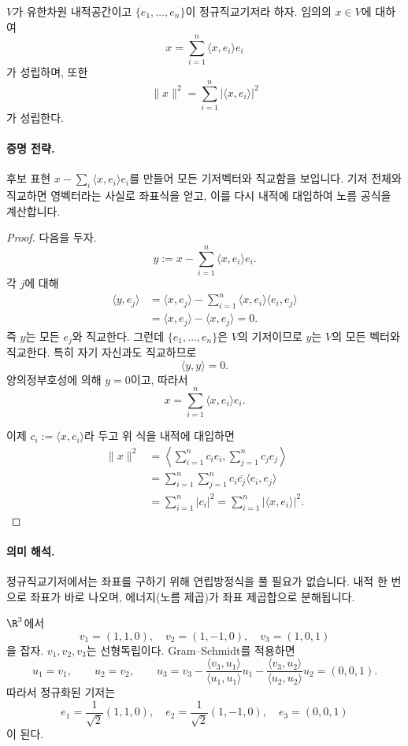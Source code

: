 \begin{theorem}
$V$가 유한차원 내적공간이고 $\{e_1,\dots,e_n\}$이 정규직교기저라 하자. 임의의 $x\in V$에 대하여
$$
x=\sum_{i=1}^n \langle x,e_i\rangle e_i
$$
가 성립하며, 또한
$$
\|x\|^2=\sum_{i=1}^n |\langle x,e_i\rangle|^2
$$
가 성립한다.
\end{theorem}

\paragraph{증명 전략.}
후보 표현 $x-\sum_i\langle x,e_i\rangle e_i$를 만들어 모든 기저벡터와 직교함을 보입니다. 기저 전체와 직교하면 영벡터라는 사실로 좌표식을 얻고, 이를 다시 내적에 대입하여 노름 공식을 계산합니다.

\begin{proof}
다음을 두자.
$$
y:=x-\sum_{i=1}^n \langle x,e_i\rangle e_i.
$$
각 $j$에 대해
\begin{align*}
\langle y,e_j\rangle
&=\langle x,e_j\rangle-\sum_{i=1}^n \langle x,e_i\rangle\langle e_i,e_j\rangle\\
&=\langle x,e_j\rangle-\langle x,e_j\rangle=0.
\end{align*}
즉 $y$는 모든 $e_j$와 직교한다. 그런데 $\{e_1,\dots,e_n\}$은 $V$의 기저이므로 $y$는 $V$의 모든 벡터와 직교한다. 특히 자기 자신과도 직교하므로
$$
\langle y,y\rangle=0.
$$
양의정부호성에 의해 $y=0$이고, 따라서
$$
x=\sum_{i=1}^n \langle x,e_i\rangle e_i.
$$

이제 $c_i:=\langle x,e_i\rangle$라 두고 위 식을 내적에 대입하면
\begin{align*}
\|x\|^2
&=\left\langle \sum_{i=1}^n c_i e_i,\sum_{j=1}^n c_j e_j\right\rangle\\
&=\sum_{i=1}^n\sum_{j=1}^n c_i\overline{c_j}\langle e_i,e_j\rangle\\
&=\sum_{i=1}^n |c_i|^2
=\sum_{i=1}^n |\langle x,e_i\rangle|^2.
\end{align*}
\end{proof}

\paragraph{의미 해석.}
정규직교기저에서는 좌표를 구하기 위해 연립방정식을 풀 필요가 없습니다. 내적 한 번으로 좌표가 바로 나오며, 에너지(노름 제곱)가 좌표 제곱합으로 분해됩니다.

\begin{example}
$\R^3$에서
$$
v_1=(1,1,0),\quad v_2=(1,-1,0),\quad v_3=(1,0,1)
$$
을 잡자. $v_1,v_2,v_3$는 선형독립이다. Gram--Schmidt를 적용하면
$$
u_1=v_1,\qquad
u_2=v_2,\qquad
u_3=v_3-\frac{\langle v_3,u_1\rangle}{\langle u_1,u_1\rangle}u_1-\frac{\langle v_3,u_2\rangle}{\langle u_2,u_2\rangle}u_2=(0,0,1).
$$
따라서 정규화된 기저는
$$
e_1=\frac1{\sqrt2}(1,1,0),\quad
e_2=\frac1{\sqrt2}(1,-1,0),\quad
e_3=(0,0,1)
$$
이 된다.
\end{example}

